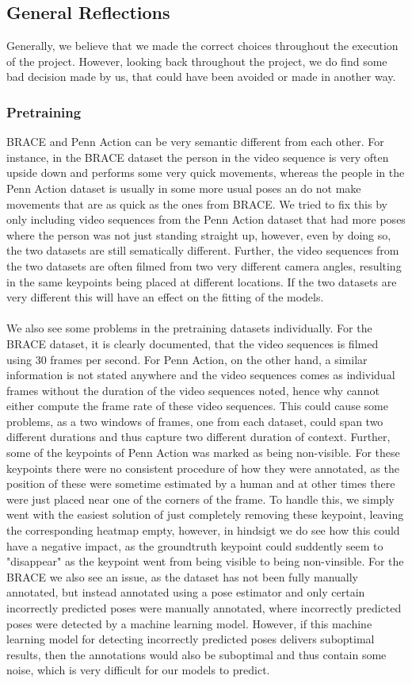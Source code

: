 \documentclass[./main.tex]{subfiles}
\begin{document}
\subsection{General Reflections}
\label{sec:general_reflections}
Generally, we believe that we made the correct choices throughout the execution of the project. However, looking back throughout the project, we do find some bad decision made by us, that could have been avoided or made in another way.

\subsubsection{Pretraining}
BRACE and Penn Action can be very semantic different from each other. For instance, in the BRACE dataset the person in the video sequence is very often upside down and performs some very quick movements, whereas the people in the Penn Action dataset is usually in some more usual poses an do not make movements that are as quick as the ones from BRACE. We tried to fix this by only including video sequences from the Penn Action dataset that had more poses where the person was not just standing straight up, however, even by doing so, the two datasets are still sematically different. Further, the video sequences from the two datasets are often filmed from two very different camera angles, resulting in the same keypoints being placed at different locations. If the two datasets are very different this will have an effect on the fitting of the models.
\\
\\
We also see some problems in the pretraining datasets individually. For the BRACE dataset, it is clearly documented, that the video sequences is filmed using 30 frames per second. For Penn Action, on the other hand, a similar information is not stated anywhere and the video sequences comes as individual frames without the duration of the video sequences noted, hence why cannot either compute the frame rate of these video sequences. This could cause some problems, as a two windows of frames, one from each dataset, could span two different durations and thus capture two different duration of context. Further, some of the keypoints of Penn Action was marked as being non-visible. For these keypoints there were no consistent procedure of how they were annotated, as the position of these were sometime estimated by a human and at other times there were just placed near one of the corners of the frame. To handle this, we simply went with the easiest solution of just completely removing these keypoint, leaving the corresponding heatmap empty, however, in hindsigt we do see how this could have a negative impact, as the groundtruth keypoint could suddently seem to "disappear" as the keypoint went from being visible to being non-vinsible. For the BRACE we also see an issue, as the dataset has not been fully manually annotated, but instead annotated using a pose estimator and only certain incorrectly predicted poses were manually annotated, where incorrectly predicted poses were detected by a machine learning model. However, if this machine learning model for detecting incorrectly predicted poses delivers suboptimal results, then the annotations would also be suboptimal and thus contain some noise, which is very difficult for our models to predict.
\end{document}
